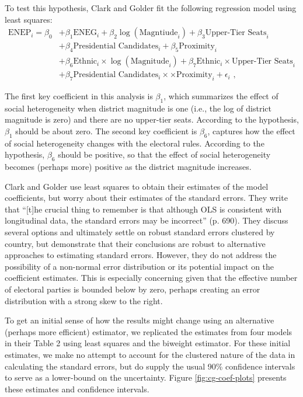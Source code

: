 \documentclass[12pt]{article}
\begin{document}
To test this hypothesis, Clark and Golder fit the following regression model using least squares:
\begin{align*}
\text{ENEP}_i = \beta_0 &+ \beta_1 \text{ENEG}_i + \beta_2 \log(\text{Magntiude}_i) + \beta_3 \text{Upper-Tier Seats}_i\\
                                                     &+\beta_4 \text{Presidential Candidates}_i + \beta_5 \text{Proximity}_i\\
                                                     &+ \beta_6 \text{Ethnic}_i \times \log (\text{Magnitude}_i) + \beta_7 \text{Ethnic}_i \times \text{Upper-Tier Seats}_i\\
                                                     &+ \beta_7 \text{Presidential Candidates}_i \times \times \text{Proximity}_i + \epsilon_i\text{ ,}
\end{align*}

The first key coefficient in this analysis is $\beta_1$, which summarizes the effect of social heterogeneity when district magnitude is one (i.e., the log of district magnitude is zero) and there are no upper-tier seats. According to the hypothesis, $\beta_1$ should be about zero. The second key coefficient is $\beta_6$, captures how the effect of social heterogeneity changes with the electoral rules. According to the hypothesis, $\beta_6$ should be positive, so that the effect of social heterogeneity becomes (perhaps more) positive as the district magnitude increases.

Clark and Golder use least squares to obtain their estimates of the model coefficients, but worry about their estimates of the standard errors. They write that ``[t]he crucial thing to remember is that although OLS is consistent with longitudinal data, the standard errors may be incorrect'' (p. 690). They discuss several options and ultimately settle on robust standard errors clustered by country, but demonstrate that their conclusions are robust to alternative approaches to estimating standard errors. However, they do not address the possibility of a non-normal error distribution or its potential impact on the coefficient estimates. This is especially concerning given that the effective number of electoral parties is bounded below by zero, perhaps creating an error distribution with a strong skew to the right. 

To get an initial sense of how the results might change using an alternative (perhaps more efficient) estimator, we replicated the estimates from four models in their Table 2 using least squares and the biweight estimator. For these initial estimates, we make no attempt to account for the clustered nature of the data in calculating the standard errors, but do supply the usual 90\% confidence intervals to serve as a lower-bound on the uncertainty. Figure \ref{fig:cg-coef-plots} presents these estimates and confidence intervals.
\end{document}
